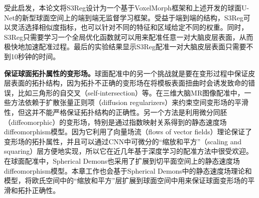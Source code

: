 受此启发，本论文将S3Reg设计为一个基于VoxelMorph框架\cite{balakrishnan2018unsupervised}和上述开发的球面U-Net的新型球面空间上的端到端无监督学习框架。受益于端到端的结构，S3Reg可以灵活选择相似度指标，也可以针对不同的特征和区域给定不同的权重。同时，S3Reg只需要学习一个全局优化函数就可以用来配准任意一对大脑皮层表面，从而极快地加速配准过程。最后的实验结果显示S3Reg配准一对大脑皮层表面只需要不到10秒钟的时间。

\textbf{保证球面拓扑属性的变形场。}\label{sec:保证球面拓扑属性的变形场}球面配准中的另一个挑战就是要在变形过程中保证皮层表面的拓扑结构，因为拓扑不正确的变形场在将模板表面扭曲时会诱发致命的错误，比如三角形的自交叉（self-intersection）等。在三维大脑MR图像配准中，一些方法\cite{balakrishnan2018unsupervised,zhou2020unsupervised}依赖于扩散张量正则项（diffusion regularizers）来约束空间变形场的平滑性，但这并不能严格保证拓扑结构的正确性。另一个方法是利用微分同胚（diffeomorphic）的变形场\cite{beg2005computing}，特别是通过指数映射关系得到的静态速度场diffeomorphism模型\cite{arsigny2006log}。因为它利用了向量场流（flows of vector fields）理论保证了变形场的拓扑属性，并且可以通过CNN中可微分的“缩放和平方”（scaling and squaring）层方便地实现\cite{dalca2018unsupervised,krebs2019learning}，所以它在近几年基于深度学习的配准方法中很受欢迎。在球面配准中，Spherical Demons\cite{yeo2009spherical}也采用了扩展到切平面空间上的静态速度场diffeomorphism模型\cite{olver2000applications}。本章工作也会基于Spherical Demons中的静态速度场理论和模型，将欧氏空间中的“缩放和平方”层扩展到球面空间中用来保证球面变形场的平滑和拓扑正确性。

